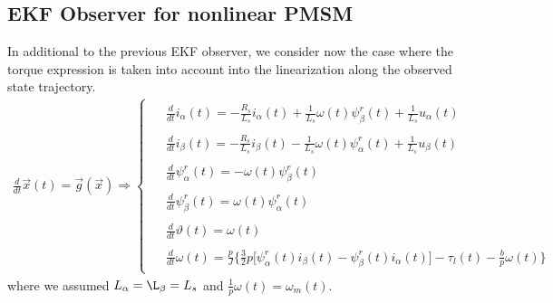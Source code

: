 \documentclass[11pt,a4paper,oneside]{book}
\numberwithin{equation}{section}
\theoremstyle{it}
\theoremstyle{definition}
\begin{document}
\subsection{EKF Observer for nonlinear PMSM}
In additional to the previous EKF observer, we consider now the case where the torque expression is taken into account into the linearization along the observed state trajectory.
\begin{align}\label{}
	\frac{d}{dt}\vec{x}(t)=\vec{g}(\vec{x})\Rightarrow\left\lbrace 
	\begin{aligned}
		\begin{split}
			&\frac{d}{dt}i_\alpha(t) = -\frac{R_s}{L_s}i_\alpha(t) + 	
			\frac{1}{L_s}\omega(t)\psi_\beta^r(t) + \frac{1}{L_s} u_\alpha(t) 
		\end{split}	\\[6pt]
		\begin{split}
			&\frac{d}{dt}i_\beta(t) = -\frac{R_s}{L_s}i_\beta(t) - 	
			\frac{1}{L_s}\omega(t)\psi_\alpha^r(t) + \frac{1}{L_s} u_\beta(t)	
		\end{split}	\\[6pt]
		\begin{split}
			&\frac{d}{dt}\psi_\alpha^r(t) = -\omega(t)\psi_\beta^r(t)
		\end{split}	\\[6pt]
		\begin{split}	
			&\frac{d}{dt}\psi_\beta^r(t) = \omega(t)\psi_\alpha^r(t)	
		\end{split}	\\[6pt]
		\begin{split}
			&\frac{d}{dt}\vartheta(t) = \omega(t)
		\end{split}	\\[6pt]
		\begin{split}
			&\frac{d}{dt}\omega(t) = 
			\frac{p}{J}\Bigg\{\frac{3}{2}p\Big[\psi^r_{\alpha}(t)i_{\beta}(t) - 
			\psi^r_{\beta}(t)i_{\alpha}(t)\Big] - \tau_l(t) 
			-\frac{b}{p}\omega(t)\Bigg\}
		\end{split}
	\end{aligned}\right. 
\end{align}
where we assumed $L_\alpha = \L_\beta = L_s$ and $\frac{1}{p}\omega(t) = \omega_m(t)$.
\end{document}
